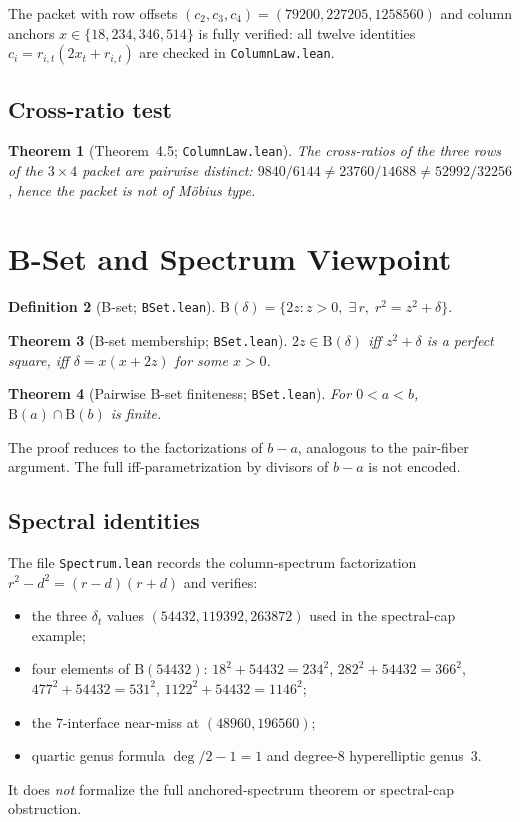 \documentclass[11pt,a4paper]{article}
\newtheorem{theorem}{Theorem}[section]
\theoremstyle{definition}
\newtheorem{definition}[theorem]{Definition}
\theoremstyle{remark}
\newcommand{\BSet}{\mathrm{B}}
\begin{document}
The packet with row offsets $(c_2,c_3,c_4)=(79200,227205,1258560)$
and column anchors $x\in\{18,234,346,514\}$ is fully verified:
all twelve identities $c_i = r_{i,t}(2x_t + r_{i,t})$ are checked
in \texttt{ColumnLaw.lean}.

\subsection{Cross-ratio test}

\begin{theorem}[Theorem~4.5; \texttt{ColumnLaw.lean}]
The cross-ratios of the three rows of the $3\times 4$ packet are
pairwise distinct:
$9840/6144 \ne 23760/14688 \ne 52992/32256$,
hence the packet is not of M\"obius type.
\end{theorem}

\section{B-Set and Spectrum Viewpoint}\label{sec:bset}

\begin{definition}[B-set; \texttt{BSet.lean}]
$\BSet(\delta) = \{2z : z>0,\; \exists\, r,\; r^2 = z^2+\delta\}$.
\end{definition}

\begin{theorem}[B-set membership; \texttt{BSet.lean}]
$2z\in\BSet(\delta)$ iff $z^2+\delta$ is a perfect square, iff
$\delta = x(x+2z)$ for some $x>0$.
\end{theorem}

\begin{theorem}[Pairwise B-set finiteness; \texttt{BSet.lean}]
For $0<a<b$, $\BSet(a)\cap\BSet(b)$ is finite.
\end{theorem}

The proof reduces to the factorizations of $b-a$, analogous to the
pair-fiber argument.  The full iff-parametrization by divisors of $b-a$ is
not encoded.

\subsection{Spectral identities}

The file \texttt{Spectrum.lean} records the column-spectrum
factorization $r^2-d^2 = (r-d)(r+d)$ and verifies:
\begin{itemize}[nosep]
\item the three $\delta_t$ values $(54432, 119392, 263872)$ used in
      the spectral-cap example;
\item four elements of $\BSet(54432)$:
      $18^2+54432=234^2$, $282^2+54432=366^2$,
      $477^2+54432=531^2$, $1122^2+54432=1146^2$;
\item the $7$-interface near-miss at $(48960,196560)$;
\item quartic genus formula $\deg/2-1 = 1$ and degree-$8$
      hyperelliptic genus~$3$.
\end{itemize}
It does \emph{not} formalize the full anchored-spectrum theorem or
spectral-cap obstruction.
\end{document}
